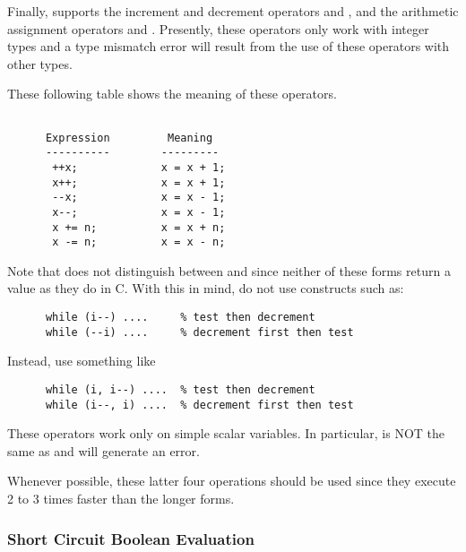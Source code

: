    Finally, \slang{} supports the increment and decrement operators \var{++}
   and \var{--}, and the arithmetic assignment operators \var{+=} and
   \var{-=}.  Presently, these operators only work with integer types and a
   type mismatch error will result from the use of these operators with
   other types.

   These following table shows the meaning of these operators.
\begin{verbatim}
        
      Expression         Meaning
      ----------        ---------
       ++x;             x = x + 1;
       x++;             x = x + 1;
       --x;             x = x - 1;
       x--;             x = x - 1;
       x += n;          x = x + n;
       x -= n;          x = x - n;

\end{verbatim}
   Note that \slang{} does not distinguish between  and 
   since neither of these forms return a value as they do in C.  With this
   in mind, do not use constructs such as:
\begin{verbatim}
      while (i--) ....     % test then decrement 
      while (--i) ....     % decrement first then test 
\end{verbatim}
   Instead, use something like
\begin{verbatim}
      while (i, i--) ....  % test then decrement
      while (i--, i) ....  % decrement first then test
\end{verbatim}
   These operators work only on simple scalar variables. In particular,
    is NOT the same as  and will generate an error.

   Whenever possible, these latter four operations should be used since they
   execute 2 to 3 times faster than the longer forms.


\subsubsection{Short Circuit Boolean Evaluation}

